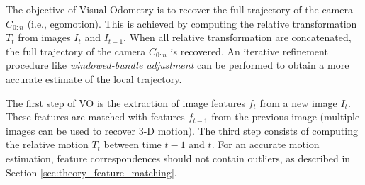 {The objective of Visual Odometry is to recover the full trajectory of the camera $C_{0:n}$ (i.e., egomotion).
This is achieved by computing the relative transformation $T_t$ from images $I_t$ and $I_{t-1}$.
When all relative transformation are concatenated, the full trajectory of the camera $C_{0:n}$ is recovered.
An iterative refinement procedure like \textit{windowed-bundle adjustment} can be performed to obtain a more accurate estimate of the local trajectory.

The first step of VO is the extraction of image features $f_t$ from a new image $I_t$.
These features are matched with features $f_{t-1}$ from the previous image (multiple images can be used to recover 3-D motion).
The third step consists of computing the relative motion $T_t$ between time $t-1$ and $t$.
For an accurate motion estimation, feature correspondences should not contain outliers, as described in Section \ref{sec:theory_feature_matching}.

}
